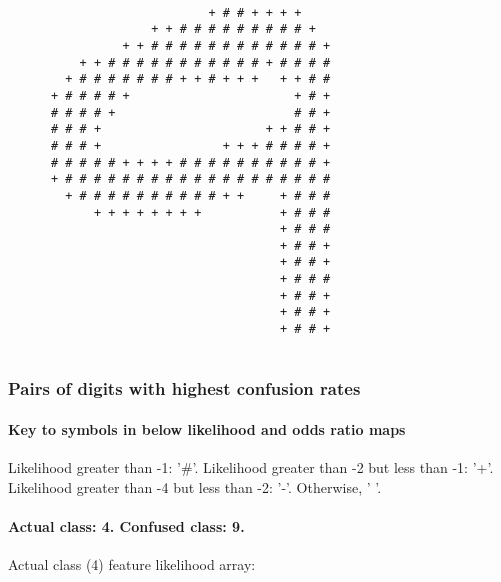 \begin{multicols*}{2}
\begin{Verbatim}[samepage=true]
                                                        
\end{Verbatim}
\begin{Verbatim}[samepage=true]
                                                        
                                                        
                                                        
                            + # # + + + +               
                    + + # # # # # # # # # +             
                + + # # # # # # # # # # # # +           
          + + # # # # # # # # # # # + # # # #           
        + # # # # # # # + + # + + +   + + # #           
      + # # # # +                       + # +           
      # # # # +                         # # +           
      # # # +                       + + # # +           
      # # # +                 + + + # # # # +           
      # # # # # + + + + # # # # # # # # # # +           
      + # # # # # # # # # # # # # # # # # # #           
        + # # # # # # # # # # + +     + # # #           
            + + + + + + + +           + # # #           
                                      + # # #           
                                      + # # +           
                                      + # # +           
                                      + # # #           
                                      + # # +           
                                      + # # +           
                                      + # # +           
                                                        

\end{Verbatim}

\subsubsection{Pairs of digits with highest confusion rates}
\paragraph{Key to symbols in below likelihood and odds ratio maps} Likelihood greater than -1: '\#'. Likelihood greater than -2 but less than -1: '+'. Likelihood greater than -4 but less than -2: '-'. Otherwise, ' '.
\newpage
\paragraph{Actual class: 4. Confused class: 9. \\}
Actual class (4) feature likelihood array:
\begin{Verbatim}[samepage=true]
                                                        

\end{Verbatim}
\end{multicols*}
